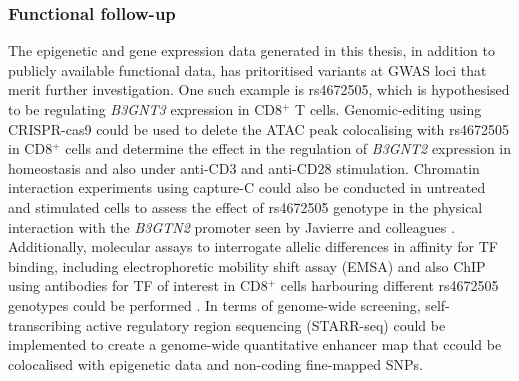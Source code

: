 \subsubsection{Functional follow-up}
The epigenetic and gene expression data generated in this thesis, in addition to publicly available functional data, has pritoritised variants at GWAS loci that merit further investigation. One such example is rs4672505, which is hypothesised to be regulating \textit{B3GNT3} expression in CD8$^+$ T cells. Genomic-editing using CRISPR-cas9 \parencite{Ding2013} could be used to delete the ATAC peak colocalising with rs4672505 in CD8$^+$ cells and determine the effect in the regulation of \textit{B3GNT2} expression in homeostasis and also under anti-CD3 and anti-CD28 stimulation. %
Chromatin interaction experiments using capture-C could also be conducted in untreated and stimulated cells to assess the effect of rs4672505 genotype in the physical interaction with the \textit{B3GTN2} promoter seen by Javierre and colleagues \parencite{Javierre2016}. Additionally, molecular assays to interrogate allelic differences in affinity for TF binding, including electrophoretic mobility shift assay (EMSA) and also ChIP using antibodies for TF of interest in CD8$^+$ cells harbouring different rs4672505 genotypes could be performed \parencite{Vernes2007}.%
 In terms of genome-wide screening, self-transcribing active regulatory region sequencing (STARR-seq) \parencite{Arnold2013} could be implemented to create a genome-wide quantitative enhancer map that ccould be colocalised with epigenetic data and non-coding fine-mapped SNPs.


